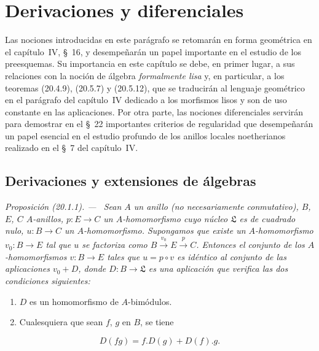 \documentclass[10pt,oneside]{book}
\makeatletter
\newcommand{\setmanualcurrentlabel}[1]{\def\@currentlabel{#1}}
\newcommand{\oldpage}[2][]{%
  \setcounter{footnote}{0}%
  \marginpar{\scriptsize\textbf{#1}~|~#2}\ignorespaces}
\newenvironment{proposition}[1][]{%
  \setmanualcurrentlabel{#1}\par\medskip\noindent\itshape Proposición (#1). ---\ }{\par}
\makeatother
\begin{document}
\section{Derivaciones y diferenciales}
\label{section:0.20-es}
\label{0.20-es}

Las nociones introducidas en este parágrafo se retomarán en forma
geométrica en el capítulo~IV, §~16, y desempeñarán un papel importante en el
estudio de los preesquemas. Su importancia en este capítulo se debe, en primer
lugar, a sus relaciones con la noción de álgebra \emph{formalmente lisa} y, en
particular, a los teoremas (20.4.9), (20.5.7) y (20.5.12), que se traducirán al
lenguaje geométrico en el parágrafo del capítulo~IV dedicado a los morfismos
lisos y son de uso constante en las aplicaciones. Por otra parte, las nociones
diferenciales servirán para demostrar en el §~22 importantes criterios de
regularidad que desempeñarán un papel esencial en el estudio profundo de los
anillos locales noetherianos realizado en el §~7 del capítulo~IV.

\subsection{Derivaciones y extensiones de álgebras}
\label{subsection:0.20.1-es}

\oldpage[0\textsubscript{IV-1}]{117}
\begin{proposition}[20.1.1]
\label{0.20.1.1-es}
Sean $A$ un anillo \textup{(no necesariamente conmutativo)}, $B$, $E$, $C$
$A$-anillos, $p:E\to C$ un $A$-homomorfismo cuyo núcleo $\mathfrak L$
es de cuadrado nulo, $u:B\to C$ un $A$-homomorfismo. Supongamos que existe
un $A$-homomorfismo $v_0:B\to E$ tal que $u$ se factoriza como
$B\xrightarrow{v_0}E\xrightarrow{p}C$. Entonces el conjunto de los
$A$-homomorfismos $v:B\to E$ tales que $u=p\circ v$ es idéntico al
conjunto de las aplicaciones $v_0+D$, donde $D:B\to\mathfrak L$ es una
aplicación que verifica las dos condiciones siguientes:
\begin{enumerate}
  \item[\rm(i)] $D$ es un homomorfismo de $A$-bimódulos.
  \item[\rm(ii)] Cualesquiera que sean $f$, $g$ en $B$, se tiene
\end{enumerate}
\begin{equation}
\tag{20.1.1.1}
\label{0.20.1.1.1-es}
  D(fg)=f.D(g)+D(f).g.
\end{equation}
\end{proposition}
\end{document}
